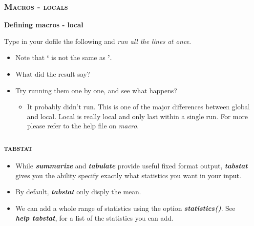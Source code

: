 \documentclass[10pt]{beamer}
\begin{document}
	

	\begin{frame}
	\frametitle{\textsc{Macros - locals}}
		\begin{center}
			 \LARGE \textbf{Defining macros - local}
		\end{center}
		Type in your dofile the following and \textit{run all the lines at once}.
		\begin{itemize}
			\item Note that \textbf{`} is not the same as \textbf{'}.
\begin{stlog}\end{stlog}
		\vspace{2mm}
		 \item What did the result say?
		\onslide<3-> 
\begin{stlog}\end{stlog}
			 \item Try running them one by one, and see what happens?
				\begin{itemize}
					 \item It probably didn't run. 
									   This is one of the major differences between global and local.
									   Local is really local and only last within a single run.
									   For more please refer to the help file on \textit{macro}.
				\end{itemize}
		\end{itemize}
	\end{frame} 
	


		
	\begin{frame}
	\frametitle{\textsc{tabstat}}
		\begin{itemize}
			\item While \textbf{\textit{summarize}} and \textbf{\textit{tabulate}} 
				  provide useful fixed format output, 
				  \textbf{\textit{tabstat}} gives you the ability specify 
				  exactly what statistics you want in your input.
			\item By default, \textbf{\textit{tabstat}} only disply the mean.
			\item We can add a whole range of statistics using the option 
				  \textbf{\textit{statistics()}}. 
				  See \textbf{\textit{help tabstat}}, for a list of the statistics you can add.
		\end{itemize}
	\end{frame}
	
\end{document}
